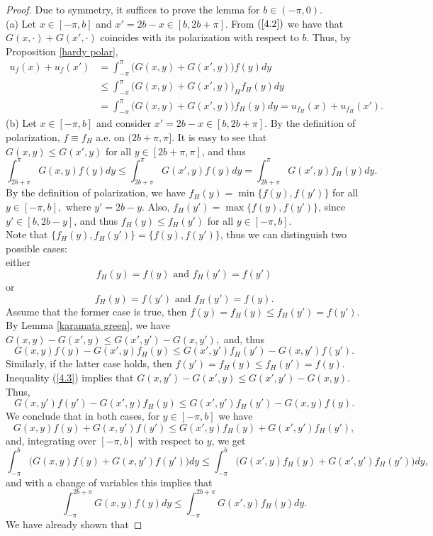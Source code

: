 \documentclass[11pt]{amsart}
\numberwithin{equation}{section}
\begin{document}
\begin{proof}
Due to symmetry, it suffices to prove the lemma for \(b\in(-\pi,0)\).\\
(a) Let \(x\in[-\pi,b]\) and \(x'=2b-x\in[b,2b+\pi].\) From \((\ref{4.2})\) we have that \(G(x,\cdot)+G(x',\cdot)\) coincides with its polarization with respect to \(b\). Thus, by Proposition \ref{hardy polar},
    \begin{align*}
    u_f(x)+u_f(x')&=\int_{-\pi}^\pi\bigl(G(x,y)+G(x',y)\bigr)f(y)dy\\
    &\leq\int_{-\pi}^\pi\bigl(G(x,y)+G(x',y)\bigr)_H f_H(y)dy\\
    &=\int_{-\pi}^\pi\bigl(G(x,y)+G(x',y)\bigr)f_H(y)dy=
    u_{f_H}(x)+u_{f_H}(x').
    \end{align*}
 (b) Let \(x\in[-\pi,b]\) and consider \(x'=2b-x\in[b,2b+\pi].\) By the definition of polarization, \(f\equiv f_H\) a.e. on \((2b+\pi,\pi]\). 
It is easy to see that \(G(x,y)\leq G(x',y)\) for all \(y\in[2b+\pi,\pi]\), and thus\\
    \[\int_{2b+\pi}^\pi G(x,y)f(y)dy\leq\int_{2b+\pi}^\pi G(x',y)f(y)dy=\int_{2b+\pi}^\pi G(x',y)f_H(y)dy.\]
By the definition of polarization, we have \(f_H(y)=\min\{f(y),f(y')\}\) for all \(y\in[-\pi,b],\) where \(y'=2b-y\). Also, \(f_H(y')=\max\{f(y),f(y')\}\), since \(y'\in[b,2b-y]\), and thus \(f_H(y)\leq f_H(y')\) for all \(y\in[-\pi,b].\)\\
Note that \(\{f_H(y),f_H(y')\}=\{f(y),f(y')\}\), thus we can distinguish two possible cases:\\
either 
    \[f_H(y)=f(y)\text{ and } f_H(y')=f(y')\]
or
\[f_H(y)=f(y')\text{ and } f_H(y')=f(y).\]
Assume that the former case is true, then \(f(y)=f_H(y)\leq f_H(y')=f(y')\).
By Lemma \ref{karamata green}, we have \(G(x,y)-G(x',y)\leq G(x',y')-G(x,y'),\) and, thus
\[G(x,y)f(y)-G(x',y)f_H(y)\leq G(x',y')f_H(y')-G(x,y')f(y').\]
Similarly, if the latter case holds, then \(f(y')=f_H(y)\leq f_H(y')=f(y)\). Inequality (\ref{4.3}) implies that \(G(x,y')-G(x',y)\leq G(x',y')-G(x,y)\). Thus,
\[G(x,y')f(y')-G(x',y)f_H(y)\leq G(x',y')f_H(y')-G(x,y)f(y).\]
We conclude that in both cases, for \(y\in[-\pi,b]\) we have
\[G(x,y)f(y)+G(x,y')f(y')\leq G(x',y)f_H(y)+G(x',y')f_H(y'),\]
and, integrating over \([-\pi,b]\) with respect to \(y\), we get
\[\int_{-\pi}^b\bigl(G(x,y)f(y)+G(x,y')f(y')\bigr)dy\leq\!\!\int_{-\pi}^b\bigl(G(x',y)f_H(y)+G(x',y')f_H(y')\bigr)dy,\]
and with a change of variables this implies that
\[\int_{-\pi}^{2b+\pi} G(x,y)f(y)dy\leq\int_{-\pi}^{2b+\pi} G(x',y)f_H(y)dy.\]
We have already shown that

\end{proof}
\end{document}
